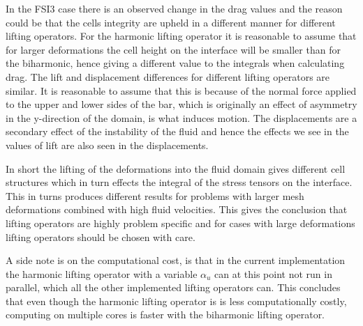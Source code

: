 In the FSI3 case there is an observed change in the drag values and the reason could be that the cells integrity are upheld in a different manner for different lifting operators. For the harmonic lifting operator it is reasonable to assume that for larger deformations the cell height on the interface will be smaller than for the biharmonic, hence giving a different value to the integrals when calculating drag. The lift and displacement differences for different lifting operators are similar. It is reasonable to assume that this is because of the normal force applied to the upper and lower sides of the bar, which is originally an effect of asymmetry in the y-direction of the domain, is what induces motion. The displacements are a secondary effect of the instability of the fluid and hence the effects we see in the values of lift are also seen in the displacements.

In short the lifting of the deformations into the fluid domain gives different cell structures which in turn effects the integral of the stress tensors on the interface. This in turns produces different results for problems with larger mesh deformations combined with high fluid velocities. This gives the conclusion that lifting operators are highly problem specific and for cases with large deformations lifting operators should be chosen with care.

A side note is on the computational cost, is that in the current implementation the harmonic lifting operator with a variable $\alpha_u$ can at this point not run in parallel, which all the other implemented lifting operators can.
This concludes that even though the harmonic lifting operator is is less computationally costly, computing on multiple cores is faster with the biharmonic lifting operator.






